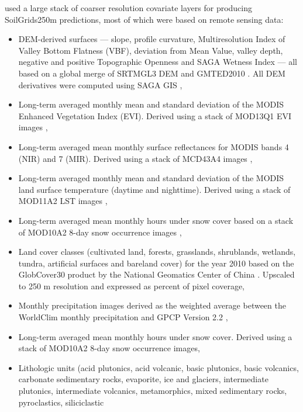 \documentclass[graybox,natbib,nospthms,UStrade]{svmono}
\begin{document}
\citet{Hengl2017SoilGrids250m} used a large stack of coarser resolution covariate layers for producing
SoilGrids250m predictions, most of which were based on remote sensing data:

\begin{itemize}
\item
  DEM-derived surfaces --- slope, profile curvature, Multiresolution
  Index of Valley Bottom Flatness (VBF), deviation from Mean Value,
  valley depth, negative and positive Topographic Openness and SAGA
  Wetness Index --- all based on a global merge of SRTMGL3 DEM and
  GMTED2010 \citep{Danielson2011GMTED}. All DEM derivatives were computed
  using SAGA GIS \citep{gmd-8-1991-2015},
\item
  Long-term averaged monthly mean and standard deviation of the MODIS
  Enhanced Vegetation Index (EVI). Derived using a stack of MOD13Q1
  EVI images \citep{Savtchenko2004ASR},
\item
  Long-term averaged mean monthly surface reflectances for MODIS bands
  4 (NIR) and 7 (MIR). Derived using a stack of MCD43A4 images
  \citep{mira2015modis},
\item
  Long-term averaged monthly mean and standard deviation of the MODIS
  land surface temperature (daytime and nighttime). Derived using a
  stack of MOD11A2 LST images \citep{wan2006modis},
\item
  Long-term averaged mean monthly hours under snow cover based on a
  stack of MOD10A2 8-day snow occurrence images \citep{hall2007accuracy},
\item
  Land cover classes (cultivated land, forests, grasslands,
  shrublands, wetlands, tundra, artificial surfaces and
  bareland cover) for the year 2010 based on the GlobCover30 product
  by the National Geomatics Center of China \citep{Chen2014}. Upscaled to
  250 m resolution and expressed as percent of pixel coverage,
\item
  Monthly precipitation images derived as the weighted average between
  the WorldClim monthly precipitation \citep{Hijmans2005IJC} and GPCP Version
  2.2 \citep{huffman2009gpcp},
\item
  Long-term averaged mean monthly hours under snow cover. Derived
  using a stack of MOD10A2 8-day snow occurrence images,
\item
  Lithologic units (acid plutonics, acid volcanic, basic plutonics,
  basic volcanics, carbonate sedimentary rocks, evaporite, ice and
  glaciers, intermediate plutonics, intermediate volcanics,
  metamorphics, mixed sedimentary rocks, pyroclastics, siliciclastic

\end{itemize}
\end{document}
